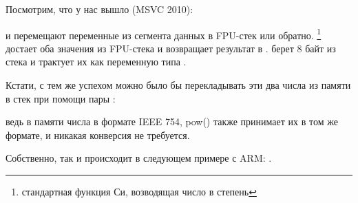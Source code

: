 
Посмотрим, что у нас вышло (MSVC 2010):



\FLD и \FSTP перемещают переменные из сегмента данных в FPU-стек или обратно. 
\footnote{стандартная функция Си, возводящая число в степень} достает оба значения из FPU-стека и 
возвращает результат в . 
\printf берет 8 байт из стека и трактует их как переменную типа \Tdouble.

Кстати, с тем же успехом можно было бы перекладывать эти два числа из памяти в стек при помощи пары \MOV:
 
ведь в памяти числа в формате IEEE 754, pow() также принимает их в том же
формате, и никакая конверсия не требуется.

Собственно, так и происходит в следующем примере с ARM: .

